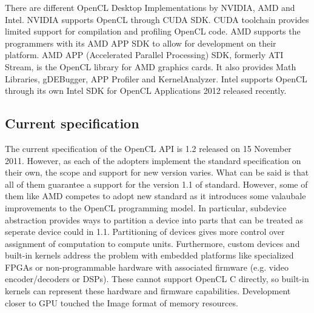 There are different OpenCL Desktop Implementations by NVIDIA, AMD and Intel. NVIDIA supports OpenCL through CUDA SDK. CUDA toolchain provides limited support for compilation and profiling OpenCL code. AMD supports the programmers with its AMD APP SDK to allow for development on their platform. AMD APP (Accelerated Parallel Processing) SDK, formerly ATI Stream, is the OpenCL library for AMD graphics cards. It also provides Math Libraries, gDEBugger, APP Profiler and KernelAnalyzer. Intel supports OpenCL through its own Intel SDK for OpenCL Applications 2012 released recently. 







\subsection{Current specification}
The current specification of the OpenCL API is 1.2 released on 15 November 2011. However, as each of the adopters implement the standard specification on their own, the scope and support for new version varies. What can be said is that all of them guarantee a support for the version 1.1 of standard. However, some of them like AMD competes to adopt new standard as it introduces some valaubale improvements to the OpenCL programming model. In particular, subdevice abstraction provides ways to partition a device into parts that can be treated as seperate device could in 1.1. Partitioning of devices gives more control over assignment of computation to compute units. Furthermore, custom devices and built-in kernels address the problem with embedded platforms like specialized FPGAs or non-programmable hardware with associated firmware (e.g. video encoder/decoders or DSPs). These cannot support OpenCL C directly, so built-in kernels can represent these hardware and firmware capabilities. Development closer to GPU touched the Image format of memory resources.

